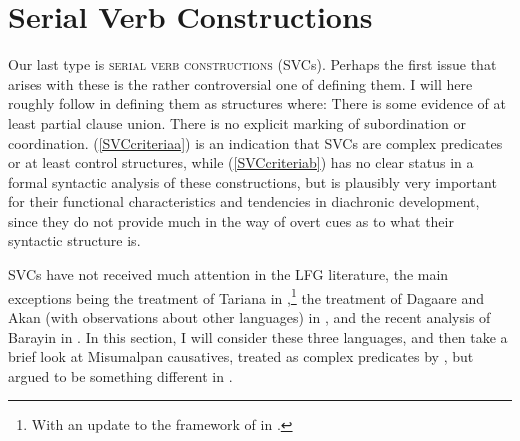 \documentclass[output=paper,hidelinks]{langscibook}
\begin{document}
\section{Serial Verb Constructions}
Our last type is \textsc{serial verb constructions} (SVCs).  Perhaps the first issue that arises
with these is the rather controversial one of defining them.  I will here
roughly follow \citet{Aikhenvald2006} in defining them as structures where:
\ea\label{SVCcriteria}
\ea\label{SVCcriteriaa} There is some evidence of at least partial clause union.
\ex\label{SVCcriteriab} There is no explicit marking of subordination or coordination.
\z\z
(\ref{SVCcriteriaa}) is an indication that SVCs are complex predicates or at least control structures,
while (\ref{SVCcriteriab}) has no clear status in a formal syntactic analysis of these constructions,
but is plausibly very important for their functional characteristics and tendencies
in diachronic development, since they do not provide much in the way of overt cues
as to what their syntactic structure is.

SVCs have not received much attention in the LFG literature, the main exceptions
being the treatment of Tariana in \citet{AndrewsManning1999},\footnote
 {With an update to the framework of \citet{Andrews2018shs} in \citet{Andrews2018mapps}.}
the treatment of Dagaare and Akan (with observations about other languages)
in \citet{Bodomo1997}, and the recent analysis of Barayin in \citet{Lovestrand2018}.
In this section, I will consider these three languages, and then take a brief look
at Misumalpan causatives, treated as complex predicates by \citet{AndrewsManning1999},
but argued to be something different in \citet{Andrews2018mapps}.
\end{document}

